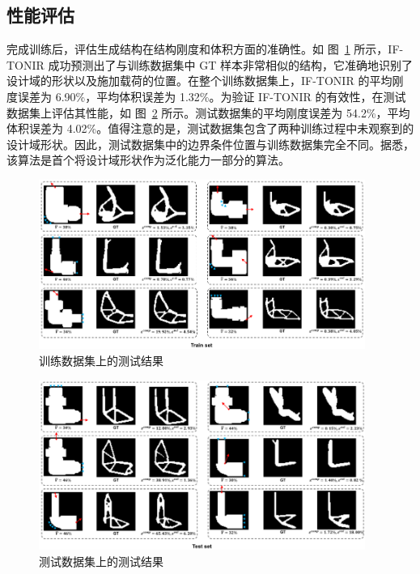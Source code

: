 \subsection{性能评估}
完成训练后，评估生成结构在结构刚度和体积方面的准确性。如 图~\ref{fig:eval-train} 所示，IF-TONIR 成功预测出了与训练数据集中 GT 样本非常相似的结构，它准确地识别了设计域的形状以及施加载荷的位置。在整个训练数据集上，IF-TONIR 的平均刚度误差为 6.90\%，平均体积误差为 1.32\%。为验证 IF-TONIR 的有效性，在测试数据集上评估其性能，如 图~\ref{fig:eval-test} 所示。测试数据集的平均刚度误差为 54.2\%，平均体积误差为 4.02\%。值得注意的是，测试数据集包含了两种训练过程中未观察到的设计域形状。因此，测试数据集中的边界条件位置与训练数据集完全不同。据悉，该算法是首个将设计域形状作为泛化能力一部分的算法。
\begin{figure}[htbp]
    \centering
    \includegraphics[width=0.95\textwidth]{./figures/TONIR/results-train.png}
    \caption{训练数据集上的测试结果}
    \label{fig:eval-train}
\end{figure}
\begin{figure}[htbp]
    \centering
    \includegraphics[width=0.95\textwidth]{./figures/TONIR/results-test.png}
    \caption{测试数据集上的测试结果}
    \label{fig:eval-test}
\end{figure}



